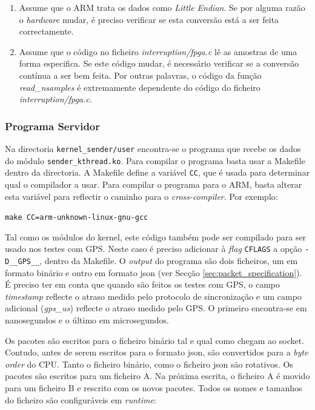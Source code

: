 \documentclass[10pt,a4paper,oneside]{book}
\begin{document}
    \begin{enumerate}
    \item Assume que o ARM trata os dados como \emph{Little Endian}. Se por alguma razão o \emph{hardware} mudar, é preciso verificar se esta conversão está a ser feita correctamente.
    \item Assume que o código no ficheiro \emph{interruption/fpga.c} lê as amostras de uma forma especifica. Se este código mudar, é necessário verificar se a conversão contínua a ser bem feita. Por outras palavras, o código da função \emph{read\_nsamples} é extremamente dependente do código do ficheiro \emph{interruption/fpga.c}.
    \end{enumerate}

    \subsubsection{Programa Servidor}
    
    Na directoria {\tt kernel\_sender/user} encontra-se o programa que recebe os dados do módulo {\tt sender\_kthread.ko}. Para compilar o programa basta usar a Makefile dentro da directoria. A Makefile define a variável {\tt CC}, que é usada para determinar qual o compilador a usar. Para compilar o programa para o ARM, basta alterar esta variável para reflectir o caminho para o \emph{cross-compiler}. Por exemplo:

    \begin{flushleft}
      {\tt make CC=arm-unknown-linux-gnu-gcc}
    \end{flushleft}

    Tal como os módulos do kernel, este código também pode ser compilado para ser usado nos testes com GPS. Neste caso é preciso adicionar à \emph{flag} {\tt CFLAGS} a opção {\tt -D\_\_GPS\_\_}, dentro da Makefile. O \emph{output} do programa são dois ficheiros, um em formato binário e outro em formato json (ver Secção \ref{sec:packet_specification}). É preciso ter em conta que quando são feitos os testes com GPS, o campo \emph{timestamp} reflecte o atraso medido pelo protocolo de sincronização e um campo adicional (\emph{gps\_us}) reflecte o atraso medido pelo GPS. O primeiro encontra-se em nanosegundos e o último em microsegundos.

    Os pacotes são escritos para o ficheiro binário tal e qual como chegam ao socket. Contudo, antes de serem escritos para o formato json, são convertidos para a \emph{byte order} do CPU. Tanto o ficheiro binário, como o ficheiro json são rotativos. Os pacotes são escritos para um ficheiro A. Na próxima escrita, o ficheiro A é movido para um ficheiro B e rescrito com os novos pacotes. Todos os nomes e tamanhos do ficheiro são configuráveis em \emph{runtime}:
\end{document}
